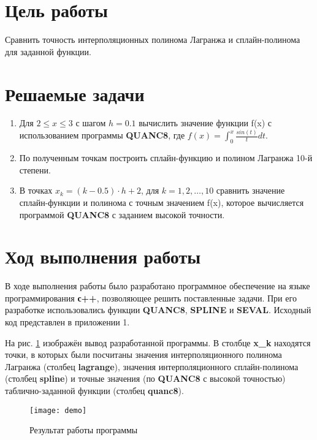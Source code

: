 




\section{Цель работы}
Сравнить точность интерполяционных полинома Лагранжа и сплайн-полинома для заданной функции.

\section{Решаемые задачи}
\begin{enumerate}

\item Для $2 \leq x \leq 3$ с шагом $h = 0.1$ вычислить значение функции f(x) с использованием программы \textbf{QUANC8}, где $f(x) = \int_{0}^{x} \frac{sin(t)}{t} dt$.

\item По полученным точкам построить сплайн-функцию и полином Лагранжа 10-й степени.

\item  В точках $x_k = (k - 0.5) \cdot h + 2$, для $k = 1, 2, \dots, 10$ сравнить значение сплайн-функции и полинома с точным значением f(x), которое вычисляется программой \textbf{QUANC8} с заданием высокой точности.
\end{enumerate}


\section{Ход выполнения работы}

В ходе выполнения работы было разработано программное обеспечение на языке программирования \textbf{с++}, позволяющее решить поставленные задачи. При его разработке использовались функции \textbf{QUANC8}, \textbf{SPLINE} и \textbf{SEVAL}. Исходный код представлен в приложении 1.

 На рис. \ref{pic:demo} изображён вывод разработанной программы. В столбце \textbf{x\_k} находятся точки, в которых были посчитаны значения интерполяционного полинома Лагранжа (столбец \textbf{lagrange}), значения интерполяционного сплайн-полинома (столбец \textbf{spline}) и точные значения (по \textbf{QUANC8} с высокой точностью) таблично-заданной функции (столбец \textbf{quanc8}).

\begin{figure}[H]
	\begin{center}
		\texttt{[image: demo]}
		\caption{Результат работы программы} 
		\label{pic:demo} %
	\end{center}
\end{figure}

